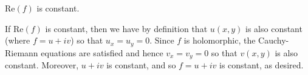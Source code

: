 $\text{Re}(f)$ is constant.

\begin{solution}
    If $\text{Re}(f)$ is constant, then we have by definition that $u(x, y)$ is also constant (where $f = u + iv$) so 
    that $u_x = u_y = 0$. Since $f$ is holomorphic, the Cauchy-Riemann equations are satisfied and hence 
    $v_x = v_y = 0$ so that $v(x, y)$ is also constant. Moreover, $u + i v$ is constant, and so $f = u + iv$ is 
    constant, as desired.
    \ \\
\end{solution}